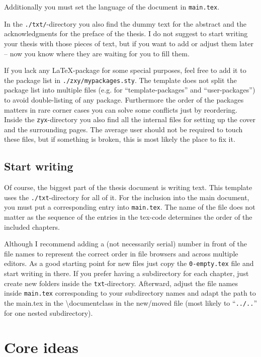 \documentclass[../main.tex]{subfiles}
\begin{document}
Additionally you must set the language of the document in \texttt{main.tex}. 

In the \texttt{./txt/}-directory you also find the dummy text for the abstract and the acknowledgments for the preface of the thesis.
I do not suggest to start writing your thesis with those pieces of text, but if you want to add or adjust them later -- now you know where they are waiting for you to fill them.

If you lack any LaTeX-package for some special purposes, feel free to add it to the package list in \texttt{./zxy/mypackages.sty}.
The template does not split the package list into multiple files (e.g. for \enquote{template-packages} and \enquote{user-packages}) to avoid double-listing of any package.
Furthermore the order of the packages matters in rare corner cases you can solve some conflicts just by reordering.
Inside the \texttt{zyx}-directory you also find all the internal files for setting up the cover and the surrounding pages.
The average user should not be required to touch these files, but if something is broken, this is most likely the place to fix it.

\newpage
\subsection{Start writing}

Of course, the biggest part of the thesis document is writing text.
This template uses the \texttt{./txt}-directory for all of it.
For the inclusion into the main document, you must put a corresponding entry into \texttt{main.tex}.
The name of the file does not matter as the sequence of the entries in the tex-code determines the order of the included chapters.

Although I recommend adding a (not necessarily serial) number in front of the file names to represent the correct order in file browsers and across multiple editors.
As a good starting point for new files just copy the \texttt{0-empty.tex} file and start writing in there.
If you prefer having a subdirectory for each chapter, just create new folders inside the \texttt{txt}-directory.
Afterward, adjust the file names inside \texttt{main.tex} corresponding to your subdirectory names and adapt the path to the main.tex in the \textbackslash documentclass in the new/moved file (most likely to \enquote{\texttt{../..}} for one nested subdirectory).


\section{Core ideas}
\end{document}
